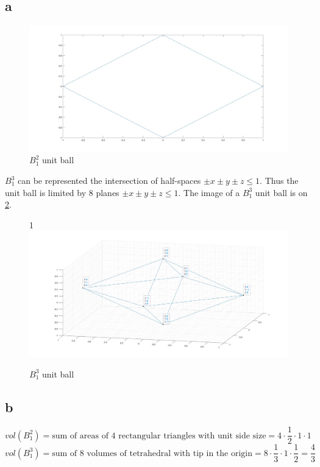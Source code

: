 \subsection*{a}
\begin{figure}[h!]
	\centering
	\includegraphics[width=\linewidth]{2dL1unitball.jpeg}
	\caption{$B^2_1$ unit ball}
	\label{fig:b21ub}
\end{figure}
$B^3_1$ can be represented the intersection of half-spaces $\pm x \pm y \pm z \leq 1$. Thus the unit ball is limited by 8 planes  $\pm x \pm y \pm z \leq 1$. The image of a $B^3_1$ unit ball is on \ref{fig:b31ub}.
\begin{figure}[h!]1
	\centering
	\includegraphics[width=\linewidth]{3dL1unitball.jpeg}
	\caption{$B^3_1$ unit ball}
	\label{fig:b31ub}
\end{figure}

\subsection*{b}
$vol(B^2_1) = \text{sum of areas of 4 rectangular triangles with unit side size} = 4 \cdot \dfrac{1}{2} \cdot 1 \cdot 1$
$vol(B^3_1) = \text{sum of 8 volumes of tetrahedral with tip in the origin} = 8 \cdot \dfrac{1}{3} \cdot 1 \cdot \dfrac{1}{2} = \dfrac{4}{3}$
